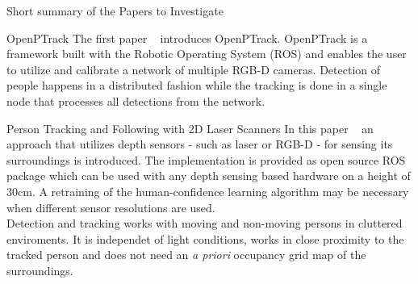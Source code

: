 \documentclass[a4paper,oneside,10pt,DIV12,headsepline,footexclude,headexclude]{scrartcl}
\begin{document}
\begin{section}{Short summary of the Papers to Investigate}

\begin{subsection}{OpenPTrack}
The first paper ~\cite{munaro2014openptrack} introduces OpenPTrack. OpenPTrack
is a framework built with the Robotic Operating System (ROS) and enables the user
to utilize and calibrate a network of multiple RGB-D cameras. Detection of people
happens in a distributed fashion while the tracking is done in a single node that
processes all detections from the network.
\end{subsection}

\begin{subsection}{Person Tracking and Following with 2D Laser Scanners}
In this paper ~\cite{7139259} an approach that utilizes depth sensors - such as
laser or RGB-D - for sensing its surroundings is introduced. The implementation
is provided as open source ROS package which can be used with any depth sensing
based hardware on a height of 30cm. A retraining of the human-confidence 
learning algorithm may be necessary when different sensor resolutions are used.\\

Detection and tracking works with moving and non-moving persons in cluttered 
enviroments. It is independet of light conditions, works in close proximity
to the tracked person and does not need an \textit{a priori} occupancy grid map 
of the surroundings.

%
%
%
%
 
\end{subsection}


\end{section}
\end{document}
